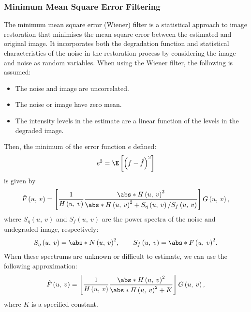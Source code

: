 \documentclass{article}
\begin{document}
\subsubsection{Minimum Mean Square Error Filtering}
The minimum mean square error (Wiener) filter is a statistical approach
to image restoration that minimises the mean square error between the
estimated and original image. It incorporates both the degradation
function and statistical characteristics of the noise in the
restoration process by considering the image and noise as random
variables. When using the Wiener filter, the following is assumed:
\begin{itemize}
    \item The noise and image are uncorrelated.
    \item The noise or image have zero mean.
    \item The intensity levels in the estimate are a linear function of
          the levels in the degraded image.
\end{itemize}
Then, the minimum of the error function \(e\) defined:
\begin{equation*}
    e^2 = \E\left[ \left( f - \hat{f} \right)^2 \right]
\end{equation*}
is given by
\begin{equation*}
    \hat{F}\left( u,\: v \right) = \left[ \frac{1}{H\left( u,\: v \right)} \frac{\abs*{H\left( u,\: v \right)}^2}{\abs*{H\left( u,\: v \right)}^2 + S_\eta\left( u,\: v \right) / S_f\left( u,\: v \right)} \right] G\left( u,\: v \right),
\end{equation*}
where \(S_\eta\left( u,\: v \right)\) and \(S_f\left( u,\: v \right)\)
are the power spectra of the noise and undegraded image, respectively:
\begin{equation*}
    S_\eta\left( u,\: v \right) = \abs*{N\left( u,\: v \right)}^2, \qquad S_f\left( u,\: v \right) = \abs*{F\left( u,\: v \right)}^2.
\end{equation*}
When these spectrums are unknown or difficult to estimate, we can use
the following approximation:
\begin{equation*}
    \hat{F}\left( u,\: v \right) = \left[ \frac{1}{H\left( u,\: v \right)} \frac{\abs*{H\left( u,\: v \right)}^2}{\abs*{H\left( u,\: v \right)}^2 + K} \right] G\left( u,\: v \right),
\end{equation*}
where \(K\) is a specified constant.
\end{document}

